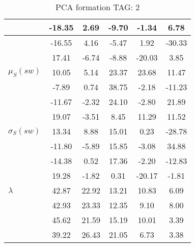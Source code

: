 \begin{table}[h!]
\begin{center}
\begin{tabular}{| l | c | c | c | c | c |}
 & -18.35  & 2.69  & -9.70  & -1.34  & 6.78 \\\hline
 & -16.55  & 4.16  & -5.47  & 1.92  & -30.33 \\\hline
 & 17.41  & -6.74  & -8.88  & -20.03  & 3.85 \\\hline
$\mu_S(sw)$ & 10.05  & 5.14  & 23.37  & 23.68  & 11.47 \\\hline
 & -7.89  & 0.74  & 38.75  & -2.18  & -11.23 \\\hline
 & -11.67  & -2.32  & 24.10  & -2.80  & 21.89 \\\hline
 & 19.07  & -3.51  & 8.45  & 11.29  & 11.52 \\\hline
$\sigma_S(sw)$ & 13.34  & 8.88  & 15.01  & 0.23  & -28.78 \\\hline
 & -11.80  & -5.89  & 15.85  & -3.08  & 34.88 \\\hline
 & -14.38  & 0.52  & 17.36  & -2.20  & -12.83 \\\hline
 & 19.28  & -1.82  & 0.31  & -20.17  & -1.81 \\\hline
$\lambda$ & 42.87  & 22.92  & 13.21  & 10.83  & 6.09 \\\hline
 & 42.93  & 23.33  & 12.35  & 9.10  & 8.00 \\\hline
 & 45.62  & 21.59  & 15.19  & 10.01  & 3.39 \\\hline
 & 39.22  & 26.43  & 21.05  & 6.73  & 3.38 \\\hline
\end{tabular}
\caption{PCA formation TAG: 2}
\end{center}
\end{table}